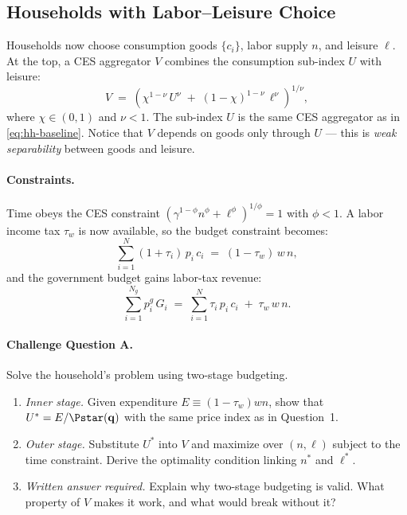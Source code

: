 \subsection{Households with Labor--Leisure Choice}
\label{subsec:hh-extended}
 
Households now choose consumption goods $\{c_i\}$, labor supply $n$, and leisure $\ell$. At the top, a CES aggregator $V$ combines the consumption sub-index $U$ with leisure:
%
\begin{equation}
    V \;=\; \left( \chi^{1-\nu}\, U^{\nu} \;+\; (1-\chi)^{1-\nu}\, \ell^{\nu} \right)^{1/\nu},
    \label{eq:V}
\end{equation}
%
where $\chi \in (0,1)$ and $\nu < 1$. The sub-index $U$ is the same CES aggregator as in \eqref{eq:hh-baseline}. Notice that $V$ depends on goods only through $U$ --- this is \emph{weak separability} between goods and leisure.
 
\paragraph{Constraints.}
Time obeys the CES constraint $\left( \gamma^{1-\phi} n^{\phi} + \ell^{\phi} \right)^{1/\phi} = 1$ with $\phi < 1$.
A labor income tax $\tau_w$ is now available, so the budget constraint becomes:
%
\begin{equation}
    \sum_{i=1}^{N} (1+\tau_i)\, p_i\, c_i \;=\; (1-\tau_w)\, w\, n,
    \label{eq:budget-extended}
\end{equation}
%
and the government budget gains labor-tax revenue:
%
\begin{equation}
    \sum_{i=1}^{N_g} p_i^g\, G_i \;=\; \sum_{i=1}^{N} \tau_i\, p_i\, c_i \;+\; \tau_w\, w\, n.
    \label{eq:gov-budget-extended}
\end{equation}
 
\paragraph{Challenge Question A.}
Solve the household's problem using two-stage budgeting.
 
\begin{enumerate}[label=(\alph*)]
    \item \emph{Inner stage.} Given expenditure $E \equiv (1-\tau_w)wn$, show that $U^* = E / \Pstar(\mathbf{q})$ with the same price index as in Question~1.
 
    \item \emph{Outer stage.} Substitute $U^*$ into $V$ and maximize over $(n, \ell)$ subject to the time constraint. Derive the optimality condition linking $n^*$ and $\ell^*$.
 
    \item \emph{Written answer required.} Explain why two-stage budgeting is valid. What property of $V$ makes it work, and what would break without it?
\end{enumerate}
 
